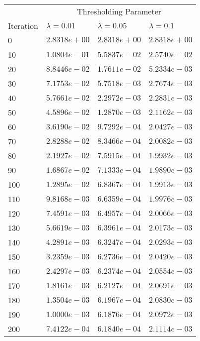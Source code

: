 \begin{tabular}{l|l|l|l}
    & \multicolumn{3}{c}{Thresholding Parameter} \\
    Iteration & $\lambda=0.01$ & $\lambda=0.05$ & $\lambda=0.1$ \\
    \hline
    0 & $2.8318e+00$ & $2.8318e+00$ & $2.8318e+00$ \\
    10 & $1.0804e-01$ & $5.5837e-02$ & $2.5740e-02$ \\
    20 & $8.8446e-02$ & $1.7611e-02$ & $5.2334e-03$ \\
    30 & $7.1753e-02$ & $5.7518e-03$ & $2.7674e-03$ \\
    40 & $5.7661e-02$ & $2.2972e-03$ & $2.2831e-03$ \\
    50 & $4.5896e-02$ & $1.2870e-03$ & $2.1162e-03$ \\
    60 & $3.6190e-02$ & $9.7292e-04$ & $2.0427e-03$ \\
    70 & $2.8288e-02$ & $8.3466e-04$ & $2.0082e-03$ \\
    80 & $2.1927e-02$ & $7.5915e-04$ & $1.9932e-03$ \\
    90 & $1.6867e-02$ & $7.1333e-04$ & $1.9890e-03$ \\
    100 & $1.2895e-02$ & $6.8367e-04$ & $1.9913e-03$ \\
    110 & $9.8168e-03$ & $6.6359e-04$ & $1.9976e-03$ \\
    120 & $7.4591e-03$ & $6.4957e-04$ & $2.0066e-03$ \\
    130 & $5.6619e-03$ & $6.3961e-04$ & $2.0173e-03$ \\
    140 & $4.2891e-03$ & $6.3247e-04$ & $2.0293e-03$ \\
    150 & $3.2359e-03$ & $6.2736e-04$ & $2.0420e-03$ \\
    160 & $2.4297e-03$ & $6.2374e-04$ & $2.0554e-03$ \\
    170 & $1.8161e-03$ & $6.2127e-04$ & $2.0691e-03$ \\
    180 & $1.3504e-03$ & $6.1967e-04$ & $2.0830e-03$ \\
    190 & $1.0000e-03$ & $6.1876e-04$ & $2.0972e-03$ \\
    200 & $7.4122e-04$ & $6.1840e-04$ & $2.1114e-03$ \\
\end{tabular}